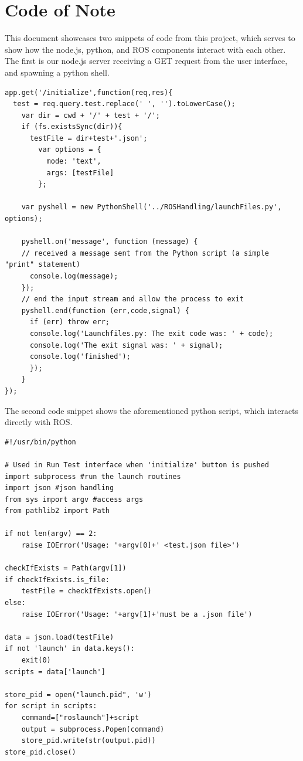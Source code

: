 \documentclass[onecolumn, draftclsnofoot,10pt, compsoc]{IEEEtran}
\begin{document}
\section{Code of Note}
This document showcases two snippets of code from this project, which serves to show how the node.js, python, and ROS components interact with each other.
\\
The first is our node.js server receiving a GET request from the user interface, and spawning a python shell.\\
\begin{verbatim}
app.get('/initialize',function(req,res){
  test = req.query.test.replace(' ', '').toLowerCase();
    var dir = cwd + '/' + test + '/';
    if (fs.existsSync(dir)){
      testFile = dir+test+'.json';
        var options = {
          mode: 'text',
          args: [testFile]
        };
	
    var pyshell = new PythonShell('../ROSHandling/launchFiles.py', options);
		
    pyshell.on('message', function (message) {
    // received a message sent from the Python script (a simple "print" statement)
      console.log(message);
    });
    // end the input stream and allow the process to exit
    pyshell.end(function (err,code,signal) {
      if (err) throw err;
      console.log('Launchfiles.py: The exit code was: ' + code);
      console.log('The exit signal was: ' + signal);
      console.log('finished');
      });
    }
});
\end{verbatim}
The second code snippet shows the aforementioned python script, which interacts directly with ROS.
\begin{verbatim}
#!/usr/bin/python

# Used in Run Test interface when 'initialize' button is pushed
import subprocess #run the launch routines
import json #json handling
from sys import argv #access args
from pathlib2 import Path

if not len(argv) == 2:
    raise IOError('Usage: '+argv[0]+' <test.json file>')

checkIfExists = Path(argv[1])
if checkIfExists.is_file:
    testFile = checkIfExists.open()
else:
    raise IOError('Usage: '+argv[1]+'must be a .json file')	

data = json.load(testFile)
if not 'launch' in data.keys():
    exit(0)
scripts = data['launch']

store_pid = open("launch.pid", 'w')
for script in scripts:
    command=["roslaunch"]+script
    output = subprocess.Popen(command) 
    store_pid.write(str(output.pid))
store_pid.close()
\end{verbatim}
\end{document}
